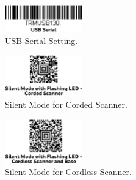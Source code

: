 \documentclass[11pt
  , a4paper
  , article
  , oneside
  , showtrims
]{memoir}
\begin{document}
\begin{figure}[!htb]
  \includegraphics[width=0.3\textwidth]{./pictures/scanner_settings_usbserial.eps}
  \caption{
            USB Serial Setting.
          }
  \label{fig:usb-serial}   
\end{figure}


\begin{figure}[!htb]
  \includegraphics[width=0.3\textwidth]{./pictures/scanner_settings_silent_corded.eps}
  \caption{
            Silent Mode for Corded Scanner.
          }
  \label{fig:silent-corded}   
\end{figure}



\begin{figure}[!htb]
  \includegraphics[width=0.3\textwidth]{./pictures/scanner_settings_silent_cordless.eps}
  \caption{
            Silent Mode for Cordless Scanner.
          }
  \label{fig:silent-cordless}   
\end{figure}


\newpage

\end{document}
